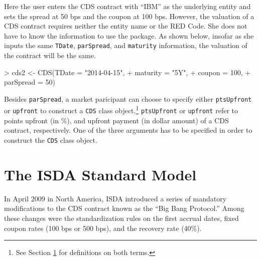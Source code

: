 \documentclass[a4paper]{article}
\renewenvironment{Schunk}{\vspace{\topsep}}{\vspace{\topsep}}
\begin{document}
Here the user enters the CDS contract with ``IBM'' as the underlying
entity and sets the spread at 50 bps and the coupon at 100
bps. However, the valuation of a CDS contract requires neither the
entity name or the RED Code. She does not have to know the information
to use the package. As shown below, insofar as she inputs the same
\texttt{TDate}, \texttt{parSpread}, and \texttt{maturity} information,
the valuation of the contract will be the same.

\begin{Schunk}
\begin{Sinput}
> cds2 <- CDS(TDate = "2014-04-15",
+             maturity = "5Y",
+             coupon = 100,
+             parSpread = 50)
\end{Sinput}
\end{Schunk}


Besides \texttt{parSpread}, a market paricipant can choose to specify
either \texttt{ptsUpfront} or \texttt{upfront} to construct a
\texttt{CDS} class object.\footnote{See Section \ref{sec:isda} for
  definitions on both terms.} \texttt{ptsUpfront} or \texttt{upfront}
refer to points upfront (in \%), and upfront payment (in dollar
amount) of a CDS contract, respectively. One of the three arguments
has to be specified in order to construct the \texttt{CDS} class
object.


\section{The ISDA Standard Model}
\label{sec:isda}

In April 2009 in North America, ISDA introduced a series of mandatory
modifications to the CDS contract known as the ``Big Bang Protocol.''
Among these changes were the standardization rules on the first
accrual dates, fixed coupon rates (100 bps or 500 bps), and the
recovery rate (40\%).

\end{document}
